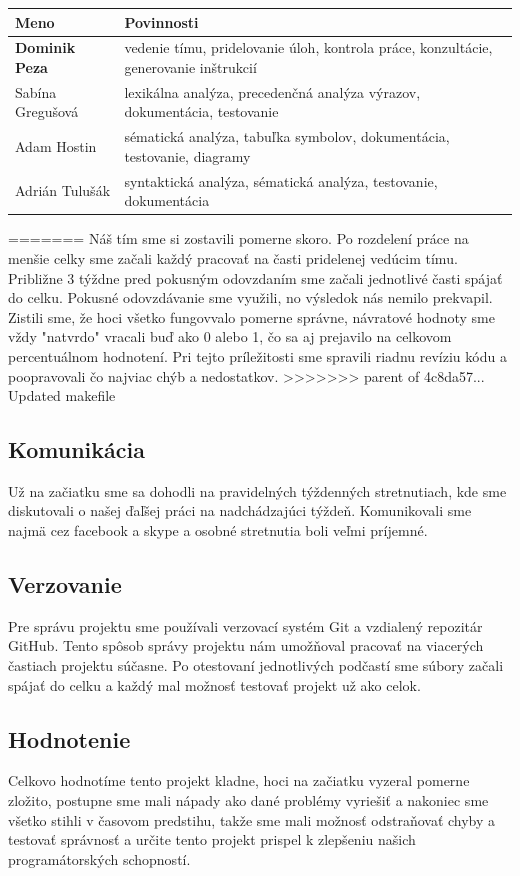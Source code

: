 \documentclass [11pt, a4paper]{article}
\begin{document}
\begin{table}[H]
\centering
\begin{tabular}{|l|l|}
\hline
Meno & Povinnosti\\ \hline
\textbf{Dominik Peza} & vedenie tímu, pridelovanie úloh, kontrola práce, konzultácie, generovanie inštrukcií\\
Sabína Gregušová & lexikálna analýza, precedenčná analýza výrazov, dokumentácia, testovanie\\
Adam Hostin & sématická analýza, tabuľka symbolov, dokumentácia, testovanie, diagramy\\
Adrián Tulušák & syntaktická analýza, sématická analýza, testovanie, dokumentácia\\
\hline
\end{tabular}
\end{table}
=======
Náš tím sme si zostavili pomerne skoro. Po rozdelení práce na menšie celky sme začali každý pracovať na časti pridelenej vedúcim tímu. Približne 3 týždne pred pokusným odovzdaním sme začali jednotlivé časti spájať do celku. Pokusné odovzdávanie sme využili, no výsledok nás nemilo prekvapil. Zistili sme, že hoci všetko fungovvalo pomerne správne, návratové hodnoty sme vždy "natvrdo" vracali buď ako 0 alebo 1, čo sa aj prejavilo na celkovom percentuálnom hodnotení. Pri tejto príležitosti sme spravili riadnu revíziu kódu a poopravovali čo najviac chýb a nedostatkov. 
>>>>>>> parent of 4c8da57... Updated makefile

\subsection{Komunikácia}
Už na začiatku sme sa dohodli na pravidelných týždenných stretnutiach, kde sme diskutovali o našej ďaľšej práci na nadchádzajúci týždeň. Komunikovali sme najmä cez facebook a skype a osobné stretnutia boli veľmi príjemné. 

\subsection{Verzovanie}
Pre správu projektu sme používali verzovací systém Git a vzdialený repozitár GitHub. Tento spôsob správy projektu nám umožňoval pracovať na viacerých častiach projektu súčasne. Po otestovaní jednotlivých podčastí sme súbory začali spájať do celku a každý mal možnosť testovať projekt už ako celok.

\subsection{Hodnotenie}
Celkovo hodnotíme tento projekt kladne, hoci na začiatku vyzeral pomerne zložito, postupne sme mali nápady ako dané problémy vyriešiť a nakoniec sme všetko stihli v časovom predstihu, takže sme mali možnosť odstraňovať chyby a testovať správnosť a určite tento projekt prispel k zlepšeniu našich programátorských schopností.
\newpage

\renewcommand{\refname}{Použitá literatúra}

\end{document}

